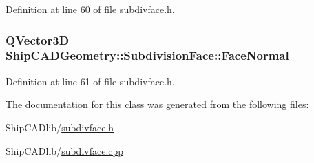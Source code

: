 Definition at line 60 of file subdivface.\-h.

\hypertarget{classShipCADGeometry_1_1SubdivisionFace_a4d9b9545d88ed7c470eadd42172c7530}{
\subsubsection[{Face\-Normal}]{\setlength{\rightskip}{0pt plus 5cm}Q\-Vector3\-D Ship\-C\-A\-D\-Geometry\-::\-Subdivision\-Face\-::\-Face\-Normal\hspace{0.3cm}{\ttfamily [read]}}}\label{classShipCADGeometry_1_1SubdivisionFace_a4d9b9545d88ed7c470eadd42172c7530}


Definition at line 61 of file subdivface.\-h.



The documentation for this class was generated from the following files\-:\begin{DoxyCompactItemize}
\item 
Ship\-C\-A\-Dlib/\hyperlink{subdivface_8h}{subdivface.\-h}\item 
Ship\-C\-A\-Dlib/\hyperlink{subdivface_8cpp}{subdivface.\-cpp}\end{DoxyCompactItemize}
